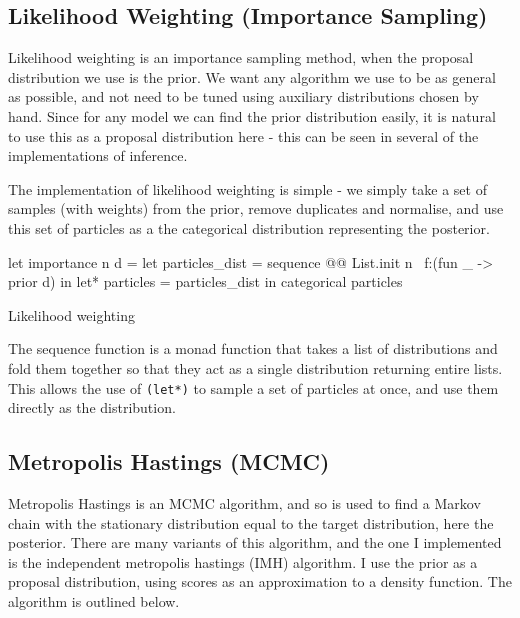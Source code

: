 \documentclass[sigconf]{acmart}
\begin{document}
\subsection{Likelihood Weighting (Importance Sampling)} \label{sec:likelihood-wighting}

Likelihood weighting is an importance sampling method, when the proposal distribution we use is the prior. We want any algorithm we use to be as general as possible, and not need to be tuned using auxiliary distributions chosen by hand. Since for any model we can find the prior distribution easily, it is natural to use this as a proposal distribution here - this can be seen in several of the implementations of inference.

The implementation of likelihood weighting is simple - we simply take a set of samples (with weights) from the prior, remove duplicates and normalise, and use this set of particles as a the categorical distribution representing the posterior.
\begin{listing}[!htb]
  \centering
  \begin{ocamlcode-in}
    let importance n d =
    let particles_dist = sequence @@ List.init n ~f:(fun _ -> prior d) in
    let* particles = particles_dist in
    categorical particles
  \end{ocamlcode-in}
  \caption{Likelihood weighting}
  \label{lst:imp}
\end{listing}

The sequence function is a monad function that takes a list of distributions and fold them together so that they act as a single distribution returning entire lists. This allows the use of \texttt{(let*)} to sample a set of particles at once, and use them directly as the distribution.

\subsection{Metropolis Hastings (MCMC)} \label{sec:mh}
Metropolis Hastings is an MCMC algorithm, and so is used to find a Markov chain with the stationary distribution equal to the target distribution, here the posterior. There are many variants of this algorithm, and the one I implemented is the independent metropolis hastings (IMH) algorithm. I use the prior as a proposal distribution, using scores as an approximation to a density function. The algorithm is outlined below.
\end{document}
